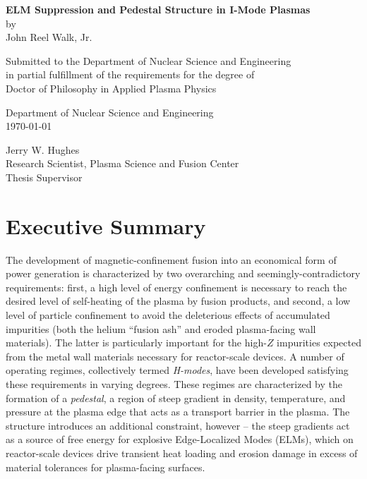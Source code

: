 \documentclass[ twoside,openright,titlepage,numbers=noenddot,headinclude,%
                footinclude=true,cleardoublepage=empty,abstractoff, %
                BCOR=5mm,paper=letter,fontsize=11pt,%
                ngerman,american,%
                ]{scrreprt}
\newcommand{\gnote}[1]{\graffito{\textcolor{red}{#1}}}
\begin{document}
\frenchspacing
\raggedbottom
{}
\pagestyle{plain}

\let\cleardoublepage\relax
\begin{center}{\large{\bf ELM Suppression and Pedestal Structure in I-Mode Plasmas} \\
by \\
John Reel Walk, Jr. \\[\baselineskip]}
\par
Submitted to the Department of Nuclear Science and Engineering \\
in partial fulfillment of the requirements for the degree of \\
Doctor of Philosophy in Applied Plasma Physics
\end{center}
\par
{}\baselineskip
\signature{Author}{Department of Nuclear Science and Engineering \\ \today}
\par
{}\baselineskip
\signature{Certified by}{Jerry W. Hughes \\ Research Scientist, Plasma Science and Fusion Center \\ Thesis Supervisor}
\par
{}\baselineskip

\chapter*{Executive Summary}

The development\gnote{not sure how specific to be with cites} of magnetic-confinement fusion into an economical form of power generation is characterized by two overarching and seemingly-contradictory requirements: first, a high level of energy confinement is necessary to reach the desired level of self-heating of the plasma by fusion products, and second, a low level of particle confinement to avoid the deleterious effects of accumulated impurities (both the helium ``fusion ash'' and eroded plasma-facing wall materials).  The latter is particularly important for the high-$Z$ impurities expected from the metal wall materials necessary for reactor-scale devices.  A number of operating regimes, collectively termed \emph{H-modes}, have been developed satisfying these requirements in varying degrees.  These regimes are characterized by the formation of a \emph{pedestal}, a region of steep gradient in density, temperature, and pressure at the plasma edge that acts as a transport barrier in the plasma.  The structure introduces an additional constraint, however -- the steep gradients act as a source of free energy for explosive Edge-Localized Modes (ELMs), which on reactor-scale devices drive transient heat loading and erosion damage in excess of material tolerances for plasma-facing surfaces.
\end{document}
